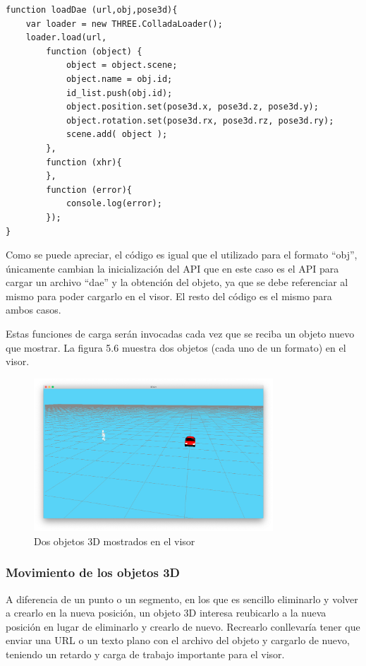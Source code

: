 \begin{itemize}
{\begin{lstlisting}[caption= Carga y visualización de objetos ``dae'', label=cod.objetosdae]
function loadDae (url,obj,pose3d){
	var loader = new THREE.ColladaLoader();
	loader.load(url, 
		function (object) {
			object = object.scene;
			object.name = obj.id;
			id_list.push(obj.id);
			object.position.set(pose3d.x, pose3d.z, pose3d.y);
			object.rotation.set(pose3d.rx, pose3d.rz, pose3d.ry);
			scene.add( object );		
		},
		function (xhr){
		},
		function (error){
			console.log(error);
		});
}
\end{lstlisting}
Como se puede apreciar, el código es igual que el utilizado para el formato ``obj'', únicamente cambian la inicialización del API que en este caso es el API para cargar un archivo ``dae'' y la obtención del objeto, ya que se debe referenciar al mismo para poder cargarlo en el visor. El resto del código es el mismo para ambos casos.}
\end{itemize}
Estas funciones de carga serán invocadas cada vez que se reciba un objeto nuevo que mostrar. La figura 5.6 muestra dos objetos (cada uno de un formato) en el visor.

\begin{figure}[H]
  \begin{center}
    \includegraphics[width=0.8\textwidth]{figures/visualizarmodel.png}
		\caption{Dos objetos 3D mostrados en el visor}
		\label{fig.visualizarmodel}
		\end{center}
\end{figure}
\subsubsection{Movimiento de los objetos 3D}
A diferencia de un punto o un segmento, en los que es sencillo eliminarlo y volver a crearlo en la nueva posición, un objeto 3D interesa reubicarlo a la nueva posición en lugar de eliminarlo y crearlo de nuevo. Recrearlo conllevaría tener que enviar una URL o un texto plano con el archivo del objeto y cargarlo de nuevo, teniendo un retardo y carga de trabajo importante para el visor.


